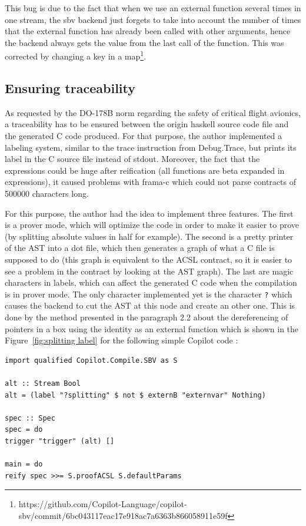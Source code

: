 \documentclass[a4paper,11pt,final]{article}
\begin{document}
	This bug is due to the fact that when we use an external function several times in one stream, the sbv backend just forgets to take into account the number of times that the external function has already been called with other arguments, hence the backend always gets the value from the last call of the function. This was corrected by changing a key in a map\footnote{https://github.com/Copilot-Language/copilot-sbv/commit/6bc043117eac17e918ac7a6363b866058911e59f}. 
	
	\subsection{Ensuring traceability}
	
	As requested by the DO-178B norm regarding the safety of critical flight avionics, a traceability has to be ensured between the origin haskell source code file and the generated C code produced. For that purpose, the author implemented a labeling system, similar to the trace instruction from Debug.Trace, but prints its label in the C source file instead of stdout. Moreover, the fact that the expressions could be huge after reification (all functions are beta expanded in expressions), it caused problems with frama-c which could not parse contracts of 500000 characters long. 
	
	For this purpose, the author had the idea to implement three features. The first is a prover mode, which will optimize the code in order to make it easier to prove (by splitting absolute values in half for example). The second is a pretty printer of the AST into a dot file, which then generates a graph of what a C file is supposed to do (this graph is equivalent to the ACSL contract, so it is easier to see a problem in the contract by looking at the AST graph). The last are magic characters in labels, which can affect the generated C code when the compilation is in prover mode. The only character implemented yet is the character \texttt{?} which causes the backend to cut the AST at this node and create an other one. This is done by the method presented in the paragraph 2.2 about the dereferencing of pointers in a box using the identity as an external function which is shown in the Figure~\ref{fig:splitting label} for the following simple Copilot code :
\begin{verbatim}
import qualified Copilot.Compile.SBV as S

alt :: Stream Bool
alt = (label "?splitting" $ not $ externB "externvar" Nothing)

spec :: Spec
spec = do
trigger "trigger" (alt) []
	
main = do
reify spec >>= S.proofACSL S.defaultParams
\end{verbatim}
\end{document}

